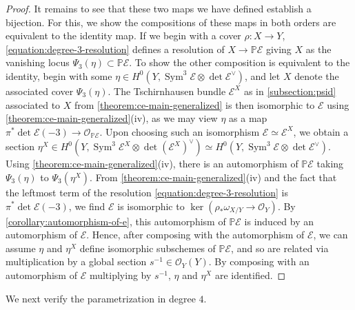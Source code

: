 \documentclass[12 pt]{amsart}
\theoremstyle{plain}
\theoremstyle{definition}
\theoremstyle{remark}
\numberwithin{equation}{section}
\newcommand\bg{\mathbb G}
\newcommand\bp{\mathbb P}
\newcommand\sce{\mathscr E}
\newcommand\sco{\mathscr O}
\DeclareMathOperator\sym{Sym}
\DeclareMathOperator\aut{Aut}
\begin{document}
\begin{proof}
	It remains to see that these two maps we have defined establish a
	bijection. For this, we show the compositions of these maps in both
	orders are equivalent to the identity map. If we begin with a cover $\rho: X \to Y$,
	\eqref{equation:degree-3-resolution} defines a resolution of $X \to \bp
	\sce$ giving $X$ as the vanishing locus $\Psi_3(\eta) \subset \bp \sce$.
	To show the other composition is equivalent to the identity, begin with some $\eta \in
	H^0(Y, \sym^3 \sce \otimes \det \sce^{\vee})$, and let $X$ denote the
	associated cover $\Psi_3(\eta)$.  The Tschirnhausen bundle $\sce^X$ 
	as in \autoref{subsection:psid}
	associated to $X$
	from \autoref{theorem:ce-main-generalized} is then isomorphic to $\sce$
	using \autoref{theorem:ce-main-generalized}(iv), as we may view $\eta$
	as a map $\pi^* \det \sce(-3) \to \sco_{\bp \sce}$.  Upon choosing such
	an isomorphism $\sce \simeq \sce^X$, we obtain a section $\eta^X \in
	H^0(Y, \sym^3 \sce^X \otimes \det (\sce^X)^{\vee}) \simeq H^0(Y, \sym^3
	\sce \otimes \det \sce^{\vee})$.  Using
	\autoref{theorem:ce-main-generalized}(iv), there is an automorphism of
	$\bp \sce$ taking $\Psi_3(\eta)$ to $\Psi_3(\eta^X)$.  
	From \autoref{theorem:ce-main-generalized}(iv) and the fact that the
	leftmost term of the resolution \eqref{equation:degree-3-resolution}
	is $\pi^* \det \sce(-3)$, we find $\sce$ is isomorphic to $\ker(\rho_*
	\omega_{X/Y} \to \sco_Y)$.
	By
	\autoref{corollary:automorphism-of-e}, this automorphism of $\bp \sce$
	is induced by an automorphism of $\sce$.  Hence, after composing with
	the automorphism of $\sce$, we can assume $\eta$ and $\eta^X$ define
	isomorphic subschemes of $\bp \sce$, and so are related via
	multiplication by a global section $s^{-1} \in \sco_Y(Y)$.  By
	composing with an automorphism of $\sce$ multiplying by $s^{-1}$,
	$\eta$ and $\eta^X$ are identified.	
\end{proof} 

We next verify the parametrization in degree $4$.
\end{document}
